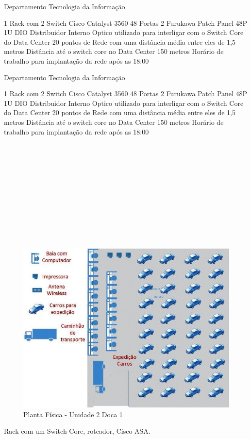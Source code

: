 \documentclass[	DIV=calc,%
							paper=a4,%
							fontsize=12pt,%
							onecolumn]{scrartcl}	 					%
\begin{document}
	Departamento Tecnologia da Informação

1 Rack com 2 Switch Cisco Catalyst 3560 48 Portas
2 Furukawa Patch Panel 48P 1U
DIO Distribuidor Interno Optico utilizado para interligar com o Switch Core do Data Center
20 pontos de Rede com uma distância média entre eles de 1,5 metros
Distância até o switch core no Data Center 150 metros
Horário de trabalho para implantação da rede após as 18:00

	Departamento Tecnologia da Informação

1 Rack com 2 Switch Cisco Catalyst 3560 48 Portas
2 Furukawa Patch Panel 48P 1U
DIO Distribuidor Interno Optico utilizado para interligar com o Switch Core do Data Center
20 pontos de Rede com uma distância média entre eles de 1,5 metros
Distância até o switch core no Data Center 150 metros
Horário de trabalho para implantação da rede após as 18:00
\\
\\
\\
\\
\\
\\
\\
\\
\\
\\
\\
\\
\begin{figure}
	\centering
	\includegraphics[]{fig6}
	\caption{Planta Física - Unidade 2 Doca 1 }
	\label{fig6}
\end{figure}
Rack com um Switch Core, roteador, Cisco ASA.
\end{document}

